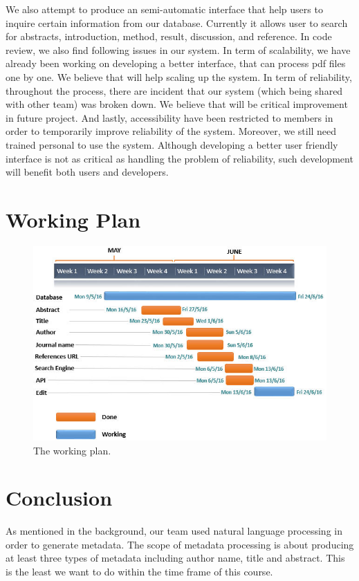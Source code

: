 	We also attempt to produce an semi-automatic interface that help users to inquire certain information from our database. 
	Currently it allows user to search for abstracts, introduction, method, result, discussion, and reference. 
	In code review, we also find following issues in our system.
	In term of scalability, we have already been working on developing a better interface, that can process pdf files one by one. 
	We believe that will help scaling up the system.
	In term of reliability, throughout the process, there are incident that our system (which being shared with other team) was broken down. 
	We believe that will be critical improvement in future project.
	And lastly, accessibility have been restricted to members in order to temporarily improve reliability of the system. 
	Moreover, we still need trained personal to use the system.
	 Although developing a better user friendly interface is not as critical as handling the problem of reliability, such development will benefit both users and developers.
	
	
\section*{Working Plan}

\begin{figure}[tbh]
	\begin{center}
		\includegraphics[width=\columnwidth]{Union_Result_Chart_working plan}
	\end{center}
	\caption{The working plan.}
	\end{figure}
	
\section*{Conclusion}
As mentioned in the background, our team used natural language processing in order to generate metadata. 
The scope of metadata processing is about producing at least three types of metadata including author name, title and abstract. 
This is the least we want to do within the time frame of this course. 

